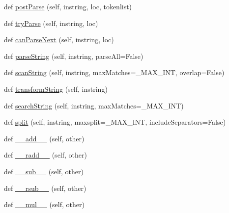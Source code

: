 \begin{DoxyCompactItemize}
\item 
def \hyperlink{classpkg__resources_1_1__vendor_1_1pyparsing_1_1ParserElement_aec3013d59c32a37672d20bc33ee1095b}{post\+Parse} (self, instring, loc, tokenlist)
\item 
def \hyperlink{classpkg__resources_1_1__vendor_1_1pyparsing_1_1ParserElement_af8000cbf8e6f7daf91b5572a1d6c1266}{try\+Parse} (self, instring, loc)
\item 
def \hyperlink{classpkg__resources_1_1__vendor_1_1pyparsing_1_1ParserElement_a9852fef0c208b9e6ee25521f2609c06b}{can\+Parse\+Next} (self, instring, loc)
\item 
def \hyperlink{classpkg__resources_1_1__vendor_1_1pyparsing_1_1ParserElement_a10680bb4fd394b631357d464b399e63a}{parse\+String} (self, instring, parse\+All=False)
\item 
def \hyperlink{classpkg__resources_1_1__vendor_1_1pyparsing_1_1ParserElement_a7e7fdf9660796750819d13908cf34edb}{scan\+String} (self, instring, max\+Matches=\+\_\+\+M\+A\+X\+\_\+\+I\+NT, overlap=False)
\item 
def \hyperlink{classpkg__resources_1_1__vendor_1_1pyparsing_1_1ParserElement_af9259df34d2c525d5dc935fe4082d40c}{transform\+String} (self, instring)
\item 
def \hyperlink{classpkg__resources_1_1__vendor_1_1pyparsing_1_1ParserElement_adaa9a7ce387e187e4505bf68a98bd626}{search\+String} (self, instring, max\+Matches=\+\_\+\+M\+A\+X\+\_\+\+I\+NT)
\item 
def \hyperlink{classpkg__resources_1_1__vendor_1_1pyparsing_1_1ParserElement_a07496b6487e5aa0d90619fa4655e8393}{split} (self, instring, maxsplit=\+\_\+\+M\+A\+X\+\_\+\+I\+NT, include\+Separators=False)
\item 
def \hyperlink{classpkg__resources_1_1__vendor_1_1pyparsing_1_1ParserElement_afa021ee7188faf2cffd826344563b6bf}{\+\_\+\+\_\+add\+\_\+\+\_\+} (self, other)
\item 
def \hyperlink{classpkg__resources_1_1__vendor_1_1pyparsing_1_1ParserElement_a07a22c340662552fc7fa5438d85647a6}{\+\_\+\+\_\+radd\+\_\+\+\_\+} (self, other)
\item 
def \hyperlink{classpkg__resources_1_1__vendor_1_1pyparsing_1_1ParserElement_a5e235bfe9c0ee06285f9d6ef8942ad1c}{\+\_\+\+\_\+sub\+\_\+\+\_\+} (self, other)
\item 
def \hyperlink{classpkg__resources_1_1__vendor_1_1pyparsing_1_1ParserElement_a5aa8f6e4729da27598fc4aad337f467f}{\+\_\+\+\_\+rsub\+\_\+\+\_\+} (self, other)
\item 
def \hyperlink{classpkg__resources_1_1__vendor_1_1pyparsing_1_1ParserElement_a6835cd6d6ff852803d7719c0428f6745}{\+\_\+\+\_\+mul\+\_\+\+\_\+} (self, other)

\end{DoxyCompactItemize}

